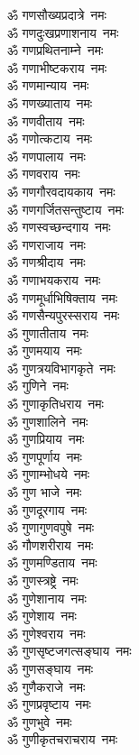 \begin{multicols}{2}
\begin{flushleft}
ॐ गणसौख्यप्रदात्रे~नमः\\
ॐ गणदुःखप्रणाशनाय~नमः\\
ॐ गणप्रथितनाम्ने~नमः\\
ॐ गणाभीष्टकराय~नमः\\
ॐ गणमान्याय~नमः\\
ॐ गणख्याताय~नमः\\
ॐ गणवीताय~नमः\hfill{}\\
ॐ गणोत्कटाय~नमः\\
ॐ गणपालाय~नमः\\
ॐ गणवराय~नमः\\
ॐ गणगौरवदायकाय~नमः\\
ॐ गणगर्जितसन्तुष्टाय~नमः\\
ॐ गणस्वच्छन्दगाय~नमः\\
ॐ गणराजाय~नमः\\
ॐ गणश्रीदाय~नमः\\
ॐ गणाभयकराय~नमः\\
ॐ गणमूर्धाभिषिक्ताय~नमः\hfill{}\\
ॐ गणसैन्यपुरस्सराय~नमः\\
ॐ गुणातीताय~नमः\\
ॐ गुणमयाय~नमः\\
ॐ गुणत्रयविभागकृते~नमः\\
ॐ गुणिने~नमः\\
ॐ गुणाकृतिधराय~नमः\\
ॐ गुणशालिने~नमः\\
ॐ गुणप्रियाय~नमः\\
ॐ गुणपूर्णाय~नमः\\
ॐ गुणाम्भोधये~नमः\hfill{}\\
ॐ गुण भाजे~नमः\\
ॐ गुणदूरगाय~नमः\\
ॐ गुणागुणवपुषे~नमः\\
ॐ गौणशरीराय~नमः\\
ॐ गुणमण्डिताय~नमः\\
ॐ गुणस्त्रष्ट्रे~नमः\\
ॐ गुणेशानाय~नमः\\
ॐ गुणेशाय~नमः\\
ॐ गुणेश्वराय~नमः\\
ॐ गुणसृष्टजगत्सङ्घाय~नमः\hfill{}\\
ॐ गुणसङ्घाय~नमः\\
ॐ गुणैकराजे~नमः\\
ॐ गुणप्रवृष्टाय~नमः\\
ॐ गुणभुवे~नमः\\
ॐ गुणीकृतचराचराय~नमः\\

\end{flushleft}
\end{multicols}
